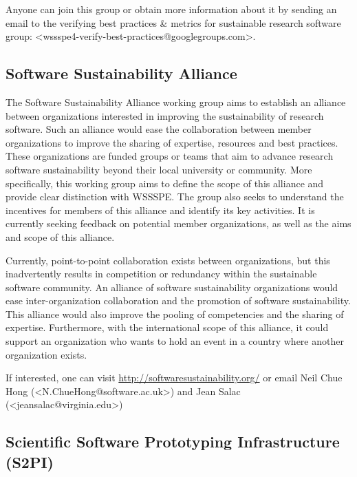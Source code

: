 \documentclass[11pt, oneside]{amsart}
\newcommand{\note}[1]{ {\textcolor{blueish}    { ***Note:      #1 }}}
\begin{document}
Anyone can join this group or obtain more information about it by sending an email to the verifying best practices \& metrics for sustainable research software group: <wssspe4-verify-best-practices@googlegroups.com>.


\subsection{Software Sustainability Alliance}
\label{sec:alliance}


The Software Sustainability Alliance working group aims to establish an alliance between organizations interested in improving the sustainability of research software. Such an alliance would ease the collaboration between member organizations to improve the sharing of expertise, resources and best practices.
These organizations are funded groups or teams that aim to advance research software sustainability beyond their local university or community. More specifically, this working group aims to define the scope of this alliance and provide clear distinction with WSSSPE. The group also seeks to understand the incentives for members of this alliance and identify its key activities.
It is currently seeking feedback on potential member organizations, as well as the aims and scope of this alliance.

Currently, point-to-point collaboration exists between organizations, but this inadvertently results in competition or redundancy within the sustainable software community. An alliance of software sustainability organizations would ease inter-organization collaboration and the promotion of software sustainability. This alliance would also improve the pooling of competencies and the sharing of expertise. Furthermore, with the international scope of this alliance, it could support an organization who wants to hold an event in a country where another organization exists.

If interested, one can visit \url{http://softwaresustainability.org/} or email Neil Chue Hong (<N.ChueHong@software.ac.uk>) and Jean Salac (<jeansalac@virginia.edu>)

\subsection{Scientific Software Prototyping Infrastructure (S2PI)}
\label{sec:prototyping}
\end{document}
